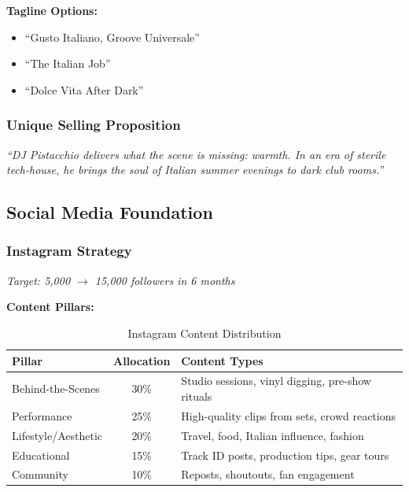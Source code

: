 \documentclass[11pt,a4paper]{article}
\begin{document}
\begin{highlightbox}
\textbf{Tagline Options:}
\begin{itemize}[leftmargin=*,topsep=0pt]
    \item ``Gusto Italiano, Groove Universale''
    \item ``The Italian Job''
    \item ``Dolce Vita After Dark''
\end{itemize}
\end{highlightbox}

\subsubsection{Unique Selling Proposition}

\begin{quotebox}
\textit{``DJ Pistacchio delivers what the scene is missing: warmth. In an era of sterile tech-house, he brings the soul of Italian summer evenings to dark club rooms.''}
\end{quotebox}

\subsection{Social Media Foundation}

\subsubsection{Instagram Strategy}
\textit{Target: 5,000 $\rightarrow$ 15,000 followers in 6 months}

\vspace{0.5em}
\noindent\textbf{Content Pillars:}

\begin{table}[h!]
\centering
\renewcommand{\arraystretch}{1.3}
\begin{tabularx}{\textwidth}{l c X}
\toprule
\rowcolor{amaraprimary}
\textcolor{amaracream}{\textbf{Pillar}} & \textcolor{amaracream}{\textbf{Allocation}} & \textcolor{amaracream}{\textbf{Content Types}} \\
\midrule
Behind-the-Scenes & 30\% & Studio sessions, vinyl digging, pre-show rituals \\
Performance & 25\% & High-quality clips from sets, crowd reactions \\
Lifestyle/Aesthetic & 20\% & Travel, food, Italian influence, fashion \\
Educational & 15\% & Track ID posts, production tips, gear tours \\
Community & 10\% & Reposts, shoutouts, fan engagement \\
\bottomrule
\end{tabularx}
\caption{Instagram Content Distribution}
\end{table}
\end{document}

